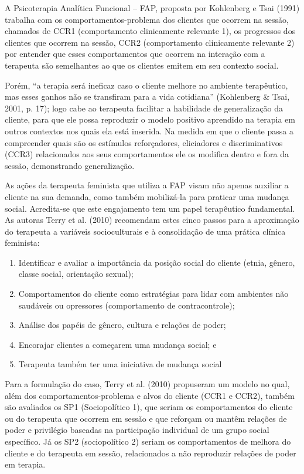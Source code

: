 A Psicoterapia Analítica Funcional – FAP, proposta por Kohlenberg e Tsai (1991) trabalha com os comportamentos-problema dos clientes que ocorrem na sessão, chamados de CCR1 (comportamento clinicamente relevante 1), os progressos dos clientes que ocorrem na sessão, CCR2 (comportamento clinicamente relevante 2) por entender que esses comportamentos que ocorrem na interação com a terapeuta são semelhantes ao que os clientes emitem em seu contexto social.

Porém, ``a terapia será ineficaz caso o cliente melhore no ambiente terapêutico, mas esses ganhos não se transfiram para a vida cotidiana'' (Kohlenberg \& Tsai, 2001, p. 17); logo cabe ao terapeuta facilitar a habilidade de generalização da cliente, para que ele possa reproduzir o modelo positivo aprendido na terapia em outros contextos nos quais ela está inserida. Na medida em que o cliente passa a compreender quais são os estímulos reforçadores, eliciadores e discriminativos (CCR3) relacionados aos seus comportamentos ele os modifica dentro e fora da sessão, demonstrando generalização.

As ações da terapeuta feminista que utiliza a FAP visam não apenas auxiliar a cliente na sua demanda, como também mobilizá-la para praticar uma mudança social. Acredita-se que este engajamento tem um papel terapêutico fundamental. As autoras Terry et al. (2010) recomendam estes cinco passos para a aproximação do terapeuta a variáveis socioculturais e à consolidação de uma prática clínica feminista: 

\begin{enumerate}
    \item Identificar e avaliar a importância da posição social do cliente (etnia, gênero, classe social, orientação sexual);
    \item Comportamentos do cliente como estratégias para lidar com ambientes não saudáveis ou opressores (comportamento de contracontrole);
    \item Análise dos papéis de gênero, cultura e relações de poder;
    \item Encorajar clientes a começarem uma mudança social; e
    \item Terapeuta também ter uma iniciativa de mudança social
\end{enumerate}

Para a formulação do caso, Terry et al. (2010) propuseram um modelo no qual, além dos comportamentos-problema e alvos do cliente (CCR1 e CCR2), também são avaliados os SP1 (Sociopolítico 1), que seriam os comportamentos do cliente ou do terapeuta que ocorrem em sessão e que reforçam ou mantêm relações de poder e privilégio baseadas na participação individual de um grupo social específico. Já os SP2 (sociopolítico 2) seriam os comportamentos de melhora do cliente e do terapeuta em sessão, relacionados a não reproduzir relações de poder em terapia.

